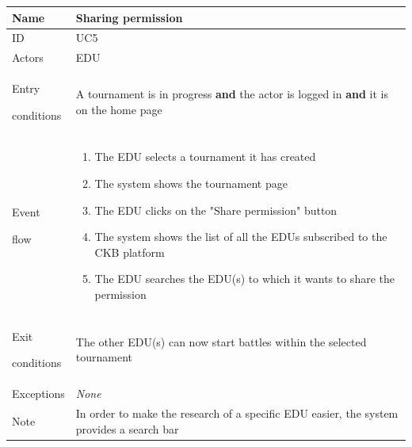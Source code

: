 \begin{center}
    \def\arraystretch{1.5}
    \begin{tabular}{| m{2cm} | m{10cm}|}
        \hline
        Name                  & Sharing permission                                                                                   \\ \hline
        ID                    & UC5                                                                                                  \\ \hline
        Actors                & EDU                                                                                                  \\ \hline
        Entry \par conditions & A tournament is in progress \textbf{and} the actor is logged in \textbf{and} it is on the home page \\ \hline
        Event \par flow       & \begin{enumerate}
                                    \item The EDU selects a tournament it has created
                                    \item The system shows the tournament page
                                    \item The EDU clicks on the "Share permission" button
                                    \item The system shows the list of all the EDUs subscribed to the CKB platform
                                    \item The EDU searches the EDU(s) to which it wants to share the permission
                                \end{enumerate}                        \\ \hline
        Exit \par conditions  & The other EDU(s) can now start battles within the selected tournament                                \\ \hline
        Exceptions            & \textit{None}                                                                                        \\ \hline
        Note                  & In order to make the research of a specific EDU easier, the system provides a search bar             \\ \hline
    \end{tabular}
\end{center}

